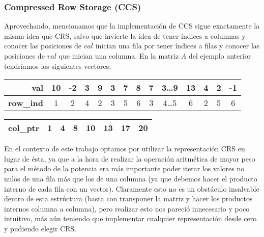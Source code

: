 \subsubsection{Compressed Row Storage (CCS)}
\par Aprovechando, mencionamos que la implementaci\'on de CCS sigue exactamente
la misma idea que CRS, salvo que invierte la idea de tener \'indices a columnas
y conocer las posiciones de $val$ inician una fila por tener \'indices a filas y
conocer las posiciones de $val$ que inician una columna. En la matriz $A$ del
ejemplo anterior tendr\'iamos los siguientes vectores\cite{netlib_ccs}:

\begin{table}[!h]
    \begin{tabular}{|r|c|c|c|c|c|c|c|c|c|c|c|c|c|}
        \hline
        \textbf{val}&10&-2&3&9&3&7&8&7&3\dots 9&13&4&2&-1\\
        \hline
        \textbf{row\_ind}&1&2&4&2&3&5&6&3&4\dots 5&6&2&5&6\\
        \hline
    \end{tabular}
    \begin{tabular}{|r|c|c|c|c|c|c|c|}
        \hline
        \textbf{col\_ptr}&1&4&8&10&13&17&20\\
        \hline
    \end{tabular}
\end{table}

\par En el contexto de este trabajo optamos por utilizar la representaci\'on CRS
en lugar de \'esta, ya que a la hora de realizar la operaci\'on aritm\'etica de
mayor peso para el m\'etodo de la potencia era m\'as importante poder iterar los
valores no nulos de una fila m\'as que los de una columna (ya que debemos hacer
el producto interno de cada fila con un vector). Claramente esto no es un
obst\'aculo insalvable dentro de esta estr\'uctura (basta con transponer la
matriz y hacer los productos internos columna a columna), pero realizar esto nos
pareci\'o innecesario y poco intuitivo, m\'as a\'un teniendo que implementar
cualquier representaci\'on desde cero y pudiendo elegir CRS.

